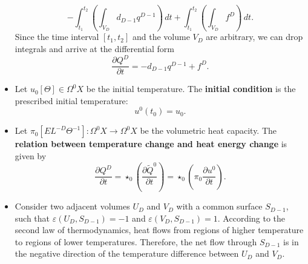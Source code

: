 \begin{discussion}
\begin{itemize}
\begin{equation}
        - \int_{t_1}^{t_2} \left(\int_{V_D} d_{D - 1} q^{D - 1} \right)\, d t
        + \int_{t_1}^{t_2} \left(\int_{V_D} f^D \right)\, d t.
      \end{equation}
      Since the time interval $[t_1, t_2]$ and the volume $V_D$ are arbitrary,
      we can drop integrals and arrive at the differential form
      \begin{equation}
        \frac{\partial Q^D}{\partial t} = - d_{D - 1} q^{D - 1} + f^D.
      \end{equation}
    \item
      Let
        $u_0 [\Theta] \in \Omega^0 X$ be the initial temperature.
      The \textbf{initial condition} is the prescribed initial temperature:
      \begin{equation}
        u^0(t_0) = u_0.
      \end{equation}
    \item
      Let $\pi_0 [E L^{-D} \Theta^{-1}] \colon \Omega^0 X \to \Omega^0 X$
      be the volumetric heat capacity.
      The \textbf{relation between temperature change and heat energy change}
      is given by
      \begin{equation}
        \frac{\partial Q^D}{\partial t}
        = \star_0 \left(\frac{\partial \tilde{Q}^0}{\partial t}\right)
        = \star_0 \left(\pi_0 \frac{\partial u^0}{\partial t}\right).
      \end{equation}
    \item
      Consider two adjacent volumes $U_D$ and $V_D$
      with a common surface $S_{D - 1}$, such that
      $\varepsilon(U_D, S_{D - 1}) = -1$ and
      $\varepsilon(V_D, S_{D - 1}) = 1$.
      According to the second law of thermodynamics, heat flows from regions of
      higher temperature to regions of lower temperatures.
      Therefore, the net flow through $S_{D - 1}$ is in the negative direction
      of the temperature difference between $U_D$ and $V_D$.


\end{itemize}
\end{discussion}

